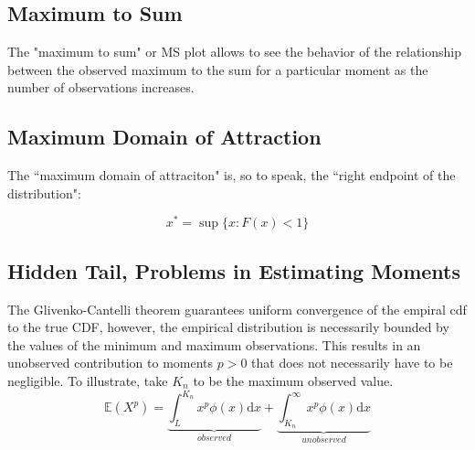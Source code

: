 \subsection{Maximum to Sum}
The "maximum to sum" or MS plot allows to see the behavior of the relationship between the observed maximum to the sum for a particular moment as the number of observations increases. 

\subsection{Maximum Domain of Attraction}

The ``maximum domain of attraciton" is, so to speak, the ``right endpoint of the distribution":

\begin{equation}
x^* = \sup\{x: F(x) < 1 \}
\end{equation}

\subsection{Hidden Tail, Problems in Estimating Moments}
The Glivenko-Cantelli theorem guarantees uniform convergence of the empiral cdf to the true CDF, however, the empirical distribution is necessarily bounded by the values of the minimum and maximum observations. This results in an unobserved contribution to moments $p>0$ that does not necessarily have to be negligible. To illustrate, take $K_n$ to be the maximum observed value. 
\begin{equation}
\mathbb{E}(X^p) = \underbrace{\int_{L}^{K_n} x^p \phi(x)\mathrm{d}x}_{observed} + \underbrace{\int_{K_n}^{\infty} x^p \phi(x)\mathrm{d}x}_{unobserved}
\end{equation}


